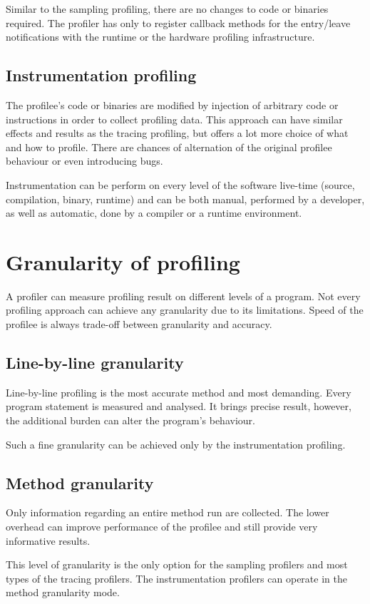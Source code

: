 Similar to the sampling profiling, there are no changes to code or binaries required. The profiler has only to register callback methods for the entry/leave notifications with the runtime or the hardware profiling infrastructure.

\subsection{Instrumentation profiling}
The profilee's code or binaries are modified by injection of arbitrary code or instructions in order to collect profiling data. This approach can have similar effects and results as the tracing profiling, but offers a lot more choice of what and how to profile. There are chances of alternation of the original profilee behaviour or even introducing bugs.

Instrumentation can be perform on every level of the software live-time (source, compilation, binary, runtime) and can be both manual, performed by a developer, as well as automatic, done by a compiler or a runtime environment.

\section{Granularity of profiling}
A profiler can measure profiling result on different levels of a program. Not every profiling approach can achieve any granularity due to its limitations. Speed of the profilee is always trade-off between granularity and accuracy. 

\subsection{Line-by-line granularity}
Line-by-line profiling is the most accurate method and most demanding. Every program statement is measured and analysed. It brings precise result, however, the additional burden can alter the program's behaviour.

Such a fine granularity can be achieved only by the instrumentation profiling.

\subsection{Method granularity} 
Only information regarding an entire method run are collected. The lower overhead can improve performance of the profilee and still provide very informative results.

This level of granularity is the only option for the sampling profilers and most types of the tracing profilers. The instrumentation profilers can operate in the method granularity mode.

